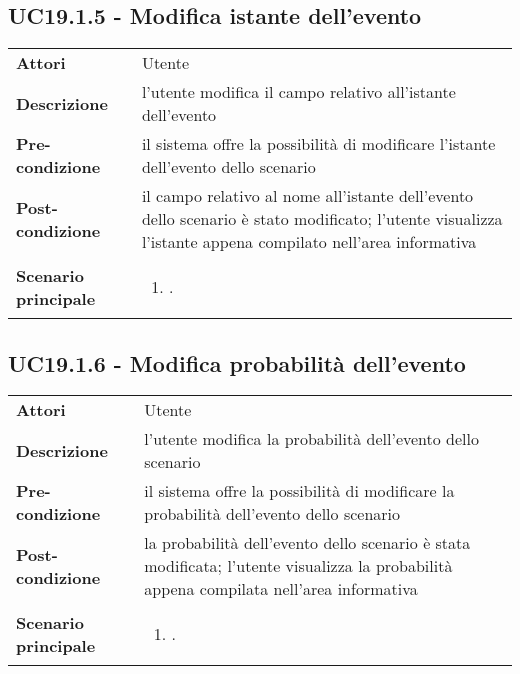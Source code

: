 \subsection{UC19.1.5 - Modifica istante dell'evento} 
\label{sssec:UC19.1.5} 
\def\arraystretch{1.5}
\begin{tabularx}{\textwidth}{l|p{}}
	\rowcolor{I} \multicolumn{2}{c}{\color{white}\textbf{UC19.1.5 - Modifica istante dell'evento}} \\
	\toprule
	\endhead
	\textbf{Attori} & Utente\\
	\textbf{Descrizione} & l'utente modifica il campo relativo all'istante dell'evento\\
	\textbf{Pre-condizione} & il sistema offre la possibilità di modificare l'istante dell'evento dello scenario\\
	\textbf{Post-condizione} & il campo relativo al nome all'istante dell'evento dello scenario è stato modificato; l'utente visualizza l'istante appena compilato nell'area informativa\\
	\textbf{Scenario principale} & \vspace{-1.2em}\begin{enumerate}[leftmargin=*,noitemsep,nosep]
		\item \nameref{sssec:UC19.1.5}.
	\end{enumerate}\\
	\bottomrule
\end{tabularx}
\subsection{UC19.1.6 - Modifica probabilità dell'evento} 
\label{sssec:UC19.1.6} 
\def\arraystretch{1.5}
\begin{tabularx}{\textwidth}{l|p{}}
	\rowcolor{I} \multicolumn{2}{c}{\color{white}\textbf{UC19.1.6 - Modifica probabilità dell'evento}} \\
	\toprule
	\endhead
	\textbf{Attori} & Utente\\
	\textbf{Descrizione} & l'utente modifica la probabilità dell'evento dello scenario\\
	\textbf{Pre-condizione} & il sistema offre la possibilità di modificare la probabilità dell'evento dello scenario\\
	\textbf{Post-condizione} & la probabilità dell'evento dello scenario è stata modificata; l'utente visualizza la probabilità appena compilata nell'area informativa\\
	\textbf{Scenario principale} & \vspace{-1.2em}\begin{enumerate}[leftmargin=*,noitemsep,nosep]
		\item \nameref{sssec:UC19.1.6}.
	\end{enumerate}\\
	\bottomrule
\end{tabularx}
